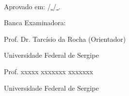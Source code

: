 \begin{titlepage}
\begin{center}
\begin{minipage}{.5\textwidth}
            \onehalfspacing
        \end{minipage}\\[2.5cm]

        \centerline{Aprovado em: \underline{ }\underline{ }\underline{ }\underline{ }\underline{ }\underline{ } /\underline{ }\underline{ }\underline{ }\underline{ }\underline{ }\underline{ } /\underline{ }\underline{ }\underline{ }\underline{ }\underline{ }\underline{ }.}
        \centerline{}
        \centerline{}
        \centerline{Banca Examinadora:}

        \centerline{}
        \centerline{\underline{ }\underline{ }\underline{ }\underline{ }\underline{ }\underline{ }\underline{ }\underline{ }\underline{ }\underline{ }\underline{ }\underline{ }\underline{ }\underline{ }\underline{ }\underline{ }\underline{ }\underline{ }\underline{ }\underline{ }\underline{ }\underline{ }\underline{ }\underline{ }\underline{ }\underline{ }\underline{ }\underline{ }\underline{ }\underline{ }\underline{ }\underline{ }\underline{ }\underline{ }\underline{ }\underline{ }\underline{ }\underline{ }\underline{ }\underline{ }\underline{ }\underline{ }\underline{ }\underline{ }\underline{ }\underline{ }\underline{ }\underline{ }\underline{ }\underline{ }\underline{ }\underline{ }\underline{ }\underline{ }\underline{ }\underline{ }\underline{ }\underline{ }\underline{ }\underline{ }\underline{ }\underline{ }\underline{ }\underline{ }\underline{ }\underline{ }\underline{ }\underline{ }\underline{ }\underline{ }\underline{ }\underline{ }\underline{ }\underline{ }\underline{ }\underline{ }\underline{ }}
        \centerline{Prof. Dr. Tarc\'isio da Rocha (Orientador)}
        \centerline{Universidade Federal de Sergipe}
        \centerline{}

        \centerline{\underline{ }\underline{ }\underline{ }\underline{ }\underline{ }\underline{ }\underline{ }\underline{ }\underline{ }\underline{ }\underline{ }\underline{ }\underline{ }\underline{ }\underline{ }\underline{ }\underline{ }\underline{ }\underline{ }\underline{ }\underline{ }\underline{ }\underline{ }\underline{ }\underline{ }\underline{ }\underline{ }\underline{ }\underline{ }\underline{ }\underline{ }\underline{ }\underline{ }\underline{ }\underline{ }\underline{ }\underline{ }\underline{ }\underline{ }\underline{ }\underline{ }\underline{ }\underline{ }\underline{ }\underline{ }\underline{ }\underline{ }\underline{ }\underline{ }\underline{ }\underline{ }\underline{ }\underline{ }\underline{ }\underline{ }\underline{ }\underline{ }\underline{ }\underline{ }\underline{ }\underline{ }\underline{ }\underline{ }\underline{ }\underline{ }\underline{ }\underline{ }\underline{ }\underline{ }\underline{ }\underline{ }\underline{ }\underline{ }\underline{ }\underline{ }\underline{ }\underline{ }}
        \centerline{Prof. xxxxx xxxxxxx xxxxxxx}
        \centerline{Universidade Federal de Sergipe}
        \centerline{}


\end{center}
\end{titlepage}
